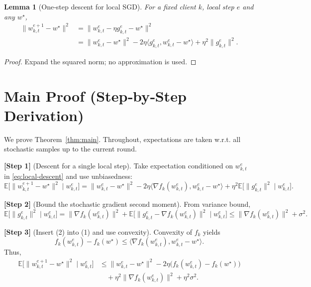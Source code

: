 \documentclass{article}
\newtheorem{lemma}{Lemma}
\newcommand{\E}{\mathbb{E}}
\begin{document}
\begin{lemma}[One‑step descent for local SGD]\label{lem:local-descent}
For a fixed client $k$, local step $e$ and any $w^\star$,
\begin{equation}\label{eq:local-descent}
\begin{aligned}
\|w_{k,t}^{e+1}-w^\star\|^2
&=\|w_{k,t}^{e}-\eta g_{k,t}^{e}-w^\star\|^2\\
&=\|w_{k,t}^{e}-w^\star\|^2-2\eta\langle g_{k,t}^{e},w_{k,t}^{e}-w^\star\rangle+\eta^2\|g_{k,t}^{e}\|^2 .
\end{aligned}
\end{equation}
\end{lemma}
\begin{proof}
Expand the squared norm; no approximation is used. \qedhere
\end{proof}

\section*{Main Proof (Step‑by‑Step Derivation)}
We prove Theorem~\ref{thm:main}. Throughout, expectations are taken w.r.t. all stochastic
samples up to the current round.

\noindent\textbf{[Step 1]} (Descent for a single local step).  
Take expectation conditioned on $w_{k,t}^{e}$ in \eqref{eq:local-descent} and use unbiasedness:
\[
\E\!\big[\|w_{k,t}^{e+1}-w^\star\|^2\mid w_{k,t}^{e}\big]
=\|w_{k,t}^{e}-w^\star\|^2-2\eta\langle\nabla f_k(w_{k,t}^{e}),w_{k,t}^{e}-w^\star\rangle
+\eta^2\E\!\big[\|g_{k,t}^{e}\|^2\mid w_{k,t}^{e}\big].
\tag{1}
\]

\noindent\textbf{[Step 2]} (Bound the stochastic gradient second moment).  
From variance bound,
\[
\E\!\big[\|g_{k,t}^{e}\|^2\mid w_{k,t}^{e}\big]
=\|\nabla f_k(w_{k,t}^{e})\|^2+\E\!\big[\|g_{k,t}^{e}-\nabla f_k(w_{k,t}^{e})\|^2\mid w_{k,t}^{e}\big]
\le \|\nabla f_k(w_{k,t}^{e})\|^2+\sigma^2.
\tag{2}
\]

\noindent\textbf{[Step 3]} (Insert (2) into (1) and use convexity).  
Convexity of $f_k$ yields
\[
f_k(w_{k,t}^{e})-f_k(w^\star)\le\langle\nabla f_k(w_{k,t}^{e}),w_{k,t}^{e}-w^\star\rangle .
\tag{3}
\]
Thus,
\[
\begin{aligned}
\E\!\big[\|w_{k,t}^{e+1}-w^\star\|^2\mid w_{k,t}^{e}\big]
&\le \|w_{k,t}^{e}-w^\star\|^2-2\eta\big(f_k(w_{k,t}^{e})-f_k(w^\star)\big)\\
&\quad+\eta^2\|\nabla f_k(w_{k,t}^{e})\|^2+\eta^2\sigma^2 .
\end{aligned}
\tag{4}
\]
\end{document}
